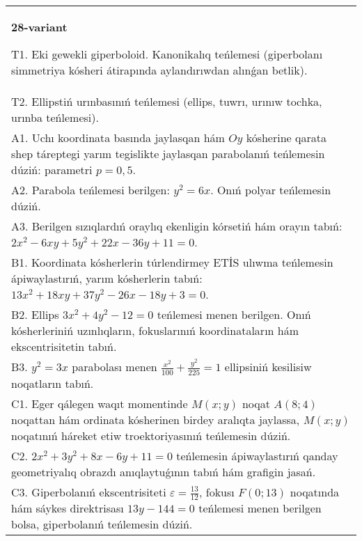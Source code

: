 \documentclass{article}
\begin{document}
\begin{tabular}{m{17cm}}
\textbf{28-variant}
\newline

T1. Eki gewekli giperboloid. Kanonikalıq teńlemesi (giperbolanı simmetriya kósheri átirapında aylandırıwdan alınǵan betlik).\\

T2. Ellipstiń urınbasınıń teńlemesi (ellips, tuwrı, urınıw tochka, urınba teńlemesi).\\

A1. Uchı koordinata basında jaylasqan hám $Oy$ kósherine qarata shep táreptegi yarım tegislikte jaylasqan parabolanıń teńlemesin dúziń: parametri $p=0,5$.\\

A2. Parabola teńlemesi berilgen: $y^2=6 x$. Onıń polyar teńlemesin dúziń.\\

A3. Berilgen sızıqlardıń oraylıq ekenligin kórsetiń hám orayın tabıń: $2 x^{2}-6 xy+5 y^{2}+22 x-36 y+11=0$.\\

B1. Koordinata kósherlerin túrlendirmey ETİS ulıwma teńlemesin ápiwaylastırıń, yarım kósherlerin tabıń: $13x^{2} + 18xy + 37y^{2} - 26x - 18y + 3 = 0$.  \\

B2. Ellips $3x^{2} + 4y^{2} - 12 = 0$ teńlemesi menen berilgen. Onıń kósherleriniń uzınlıqların, fokuslarınıń koordinataların hám ekscentrisitetin tabıń.  \\

B3. $y^{2} = 3x$ parabolası menen $\frac{x^{2}}{100} + \frac{y^{2}}{225} = 1$ ellipsiniń kesilisiw noqatların tabıń.  \\

C1. Eger qálegen waqıt momentinde $M(x;y)$ noqat $A(8;4)$ noqattan hám ordinata kósherinen birdey aralıqta jaylassa, $M(x;y)$ noqatınıń háreket etiw troektoriyasınıń teńlemesin dúziń.  \\

C2. $2x^{2} + 3y^{2} + 8x - 6y + 11 = 0$ teńlemesin ápiwaylastırıń qanday geometriyalıq obrazdı anıqlaytuǵının tabıń hám grafigin jasań.\\

C3. Giperbolanıń ekscentrisiteti $\varepsilon = \frac{13}{12}$, fokusı $F(0;13)$ noqatında hám sáykes direktrisası $13y - 144 = 0$ teńlemesi menen berilgen bolsa, giperbolanıń teńlemesin dúziń.  \\

\end{tabular}
\vspace{1cm}
\end{document}
